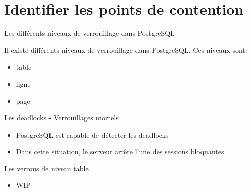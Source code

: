 
\section{Identifier les points de contention}


\begin{frame}[fragile]{Les différents niveaux de verrouillage dans PostgreSQL}

Il existe différents niveaux de verrouillage dans PostgreSQL. Ces niveaux sont:
   \begin{itemize}
      \item table
      \item ligne
      \item page
   \end{itemize}

\begin{toile}
\end{toile}

\end{frame}


\begin{frame}[fragile]{Les deadlocks - Verrouillages mortels}

   \begin{itemize}
      \item PostgreSQL est capable de détecter les deadlocks
      \item Dans cette situation, le serveur arrête l'une des sessions bloquantes
   \end{itemize}

\end{frame}


\begin{frame}[fragile]{Les verrous de niveau table}

   \begin{itemize}
      \item WIP
   \end{itemize}

\end{frame}

